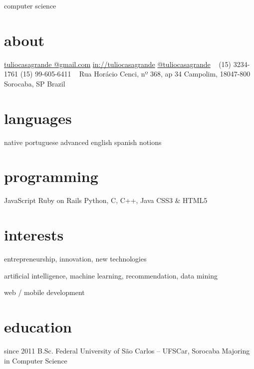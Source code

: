\documentclass[]{friggeri-cv}
\begin{document}
       {computer science}


\begin{aside}
  \section{about}
    \href{mailto:tuliocasagrande@gmail.com}{tuliocasagrande @gmail.com}
    \href{http://www.linkedin.com/in/tuliocasagrande}{in://tuliocasagrande}
    \href{https://twitter.com/tuliocasagrande}{@tuliocasagrande}
    ~
    (15) 3234-1761
    (15) 99-605-6411
    ~
    Rua Horácio Cenci,
    nº 368, ap 34
    Campolim, 18047-800
    Sorocaba, SP
    Brazil
  \section{languages}
    native portuguese
    advanced english
    spanish notions
  \section{programming}
    JavaScript
    Ruby on Rails
    Python, C, C++, Java
    CSS3 \& HTML5
\end{aside}

\section{interests}

entrepreneurship, innovation, new technologies

artificial intelligence, machine learning, recommendation, data mining

web / mobile development

\section{education}

\begin{entrylist}
  \entry
    {since 2011}
    {B.Sc.}
    {Federal University of São Carlos -- UFSCar, Sorocaba}
    {Majoring in Computer Science}
\end{entrylist}
\end{document}
